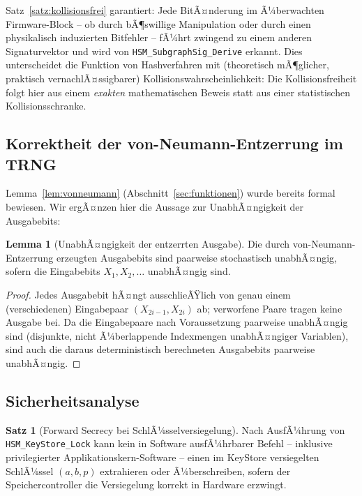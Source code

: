 ﻿\documentclass[a4paper,12pt]{article}
\theoremstyle{definition}
\newtheorem{satz}{Satz}
\newtheorem{lemma}{Lemma}
\begin{document}
Satz~\ref{satz:kollisionsfrei} garantiert: Jede BitÃ¤nderung im Ã¼berwachten Firmware-Block -- ob durch bÃ¶swillige Manipulation oder durch einen physikalisch induzierten Bitfehler -- fÃ¼hrt zwingend zu einem anderen Signaturvektor und wird von \texttt{HSM\_SubgraphSig\_Derive} erkannt. Dies unterscheidet die Funktion von Hashverfahren mit (theoretisch mÃ¶glicher, praktisch vernachlÃ¤ssigbarer) Kollisionswahrscheinlichkeit: Die Kollisionsfreiheit folgt hier aus einem \emph{exakten} mathematischen Beweis statt aus einer statistischen Kollisionsschranke.

\subsection{Korrektheit der von-Neumann-Entzerrung im TRNG}

Lemma~\ref{lem:vonneumann} (Abschnitt~\ref{sec:funktionen}) wurde bereits formal bewiesen. Wir ergÃ¤nzen hier die Aussage zur UnabhÃ¤ngigkeit der Ausgabebits:

\begin{lemma}[UnabhÃ¤ngigkeit der entzerrten Ausgabe]
	\label{lem:unabh}
	Die durch von-Neumann-Entzerrung erzeugten Ausgabebits sind paarweise stochastisch unabhÃ¤ngig, sofern die Eingabebits $X_1, X_2, \ldots$ unabhÃ¤ngig sind.
\end{lemma}

\begin{proof}
	Jedes Ausgabebit hÃ¤ngt ausschlieÃŸlich von genau einem (verschiedenen) Eingabepaar $(X_{2i-1}, X_{2i})$ ab; verworfene Paare tragen keine Ausgabe bei. Da die Eingabepaare nach Voraussetzung paarweise unabhÃ¤ngig sind (disjunkte, nicht Ã¼berlappende Indexmengen unabhÃ¤ngiger Variablen), sind auch die daraus deterministisch berechneten Ausgabebits paarweise unabhÃ¤ngig. \qedhere
\end{proof}

\subsection{Sicherheitsanalyse}

\begin{satz}[Forward Secrecy bei SchlÃ¼sselversiegelung]
	\label{satz:forward-secrecy}
	Nach AusfÃ¼hrung von \texttt{HSM\_KeyStore\_Lock} kann kein in Software ausfÃ¼hrbarer Befehl -- inklusive privilegierter Applikationskern-Software -- einen im KeyStore versiegelten SchlÃ¼ssel $(a,b,p)$ extrahieren oder Ã¼berschreiben, sofern der Speichercontroller die Versiegelung korrekt in Hardware erzwingt.
\end{satz}
\end{document}

